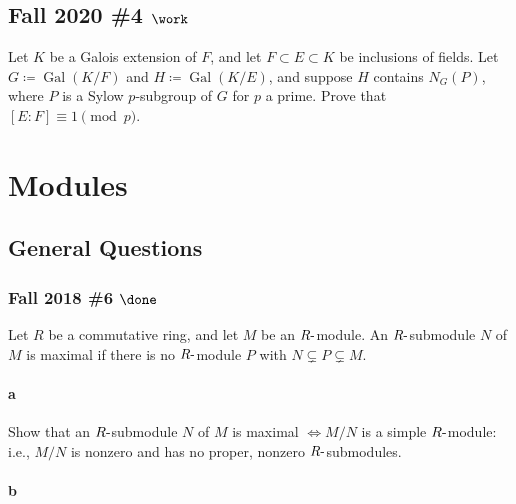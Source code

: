 \hypertarget{fall-2020-4-work}{%
\subsection{\texorpdfstring{Fall 2020 \#4
\(\work\)}{Fall 2020 \#4 \textbackslash work}}\label{fall-2020-4-work}}

Let \(K\) be a Galois extension of \(F\), and let
\(F \subset E \subset K\) be inclusions of fields. Let
\(G \coloneqq\operatorname{Gal}(K/F)\) and
\(H \coloneqq\operatorname{Gal}(K/E)\), and suppose \(H\) contains
\(N_G(P)\), where \(P\) is a Sylow \(p\)-subgroup of \(G\) for \(p\) a
prime. Prove that \([E: F] \equiv 1 \pmod p\).

\hypertarget{modules}{%
\section{Modules}\label{modules}}

\hypertarget{general-questions}{%
\subsection{General Questions}\label{general-questions}}

\hypertarget{fall-2018-6-done}{%
\subsubsection{\texorpdfstring{Fall 2018 \#6
\(\done\)}{Fall 2018 \#6 \textbackslash done}}\label{fall-2018-6-done}}

Let \(R\) be a commutative ring, and let \(M\) be an
\(R{\hbox{-}}\)module. An \(R{\hbox{-}}\)submodule \(N\) of \(M\) is
maximal if there is no \(R{\hbox{-}}\)module \(P\) with
\(N \subsetneq P \subsetneq M\).

\hypertarget{a-84}{%
\paragraph{a}\label{a-84}}

Show that an \(R{\hbox{-}}\)submodule \(N\) of \(M\) is maximal
\(\iff M /N\) is a simple \(R{\hbox{-}}\)module: i.e., \(M /N\) is
nonzero and has no proper, nonzero \(R{\hbox{-}}\)submodules.

\hypertarget{b-74}{%
\paragraph{b}\label{b-74}}

